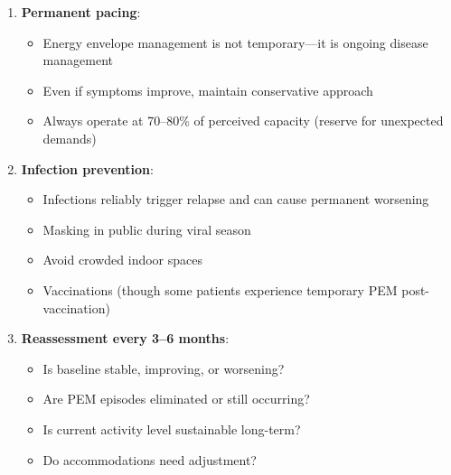 \begin{enumerate}
    \item \textbf{Permanent pacing}:
    \begin{itemize}
        \item Energy envelope management is not temporary---it is ongoing disease management
        \item Even if symptoms improve, maintain conservative approach
        \item Always operate at 70--80\% of perceived capacity (reserve for unexpected demands)
    \end{itemize}

    \item \textbf{Infection prevention}:
    \begin{itemize}
        \item Infections reliably trigger relapse and can cause permanent worsening
        \item Masking in public during viral season
        \item Avoid crowded indoor spaces
        \item Vaccinations (though some patients experience temporary PEM post-vaccination)
    \end{itemize}

    \item \textbf{Reassessment every 3--6 months}:
    \begin{itemize}
        \item Is baseline stable, improving, or worsening?
        \item Are PEM episodes eliminated or still occurring?
        \item Is current activity level sustainable long-term?
        \item Do accommodations need adjustment?
    \end{itemize}
\end{enumerate}

